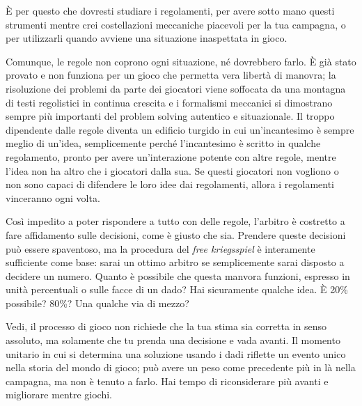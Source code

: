 È per questo che dovresti studiare i regolamenti, per avere sotto mano questi strumenti mentre crei costellazioni meccaniche piacevoli per la tua campagna, o per utilizzarli quando avviene una situazione inaspettata in gioco.


Comunque, le regole non coprono ogni situazione, né dovrebbero farlo. È già stato provato e non funziona per un gioco che permetta vera libertà di manovra; la risoluzione dei problemi da parte dei giocatori viene soffocata da una montagna di testi regolistici in continua crescita e i formalismi meccanici si dimostrano sempre più importanti del problem solving autentico e situazionale. Il \dnd{} troppo dipendente dalle regole diventa un edificio turgido in cui un'incantesimo è sempre meglio di un'idea, semplicemente perché l'incantesimo è scritto in qualche regolamento, pronto per avere un'interazione potente con altre regole, mentre l'idea non ha altro che i giocatori dalla sua. Se questi giocatori non vogliono o non sono capaci di difendere le loro idee dai regolamenti, allora i regolamenti vinceranno ogni volta.

Così impedito a poter rispondere a tutto con delle regole, l'arbitro è costretto a fare affidamento sulle decisioni, come è giusto che sia. Prendere queste decisioni può essere spaventoso, ma la procedura del \textit{free kriegsspiel} è interamente sufficiente come base: sarai un ottimo arbitro se semplicemente sarai disposto a decidere un numero. Quanto è possibile che questa manvora funzioni, espresso in unità percentuali o sulle facce di un dado? Hai sicuramente qualche idea. È 20\% possibile? 80\%? Una qualche via di mezzo?

Vedi, il processo di gioco non richiede che la tua stima sia corretta in senso assoluto, ma solamente che tu prenda una decisione e vada avanti. Il momento unitario in cui si determina una soluzione usando i dadi riflette un evento unico nella storia del mondo di gioco; può avere un peso come precedente più in là nella campagna, ma non è tenuto a farlo. Hai tempo di riconsiderare più avanti e migliorare mentre giochi.